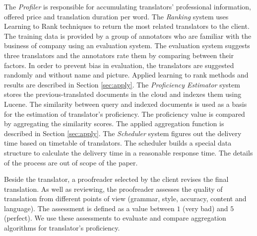 The \textit{Profiler} is responsible for accumulating translators' professional information,  offered price and translation duration per word. The \textit{Ranking} system uses Learning to Rank techniques to return the most related translators to the client. The training data is provided by a group of annotators who are familiar with the business of company using an evaluation system. The evaluation system suggests three translators and the annotators rate them by comparing between their factors. In order to prevent bias in evaluation, the translators are suggested randomly and without name and picture. Applied learning to rank methods and results are described in Section \ref{sec:apply}. The \textit{Proficiency Estimator} system stores the previous-translated documents in the cloud and indexes them using Lucene. The similarity between query and indexed documents is used as a basis for the estimation of translator's proficiency. The proficiency value is compared by aggregating the similarity scores. The applied aggregation function is described in Section \ref{sec:apply}. The \textit{Scheduler} system figures out the delivery time based on timetable of translators. The scheduler builds a special data structure to calculate the delivery time in a reasonable response time. The details of the process are out of scope of the paper.

Beside the translator, a proofreader selected by the client revises the final translation. As well as reviewing, the proofreader assesses the quality of translation from different points of view (grammar, style, accuracy, content and language). The assessment is defined as a value between $1$ (very bad) and $5$ (perfect). We use these assessments to evaluate and compare aggregation algorithms for translator's proficiency.
